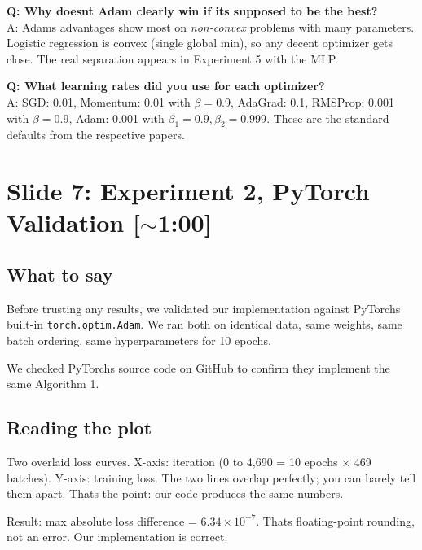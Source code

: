 \documentclass[11pt, letterpaper]{article}
\begin{document}
\begin{qabox}
\textbf{Q: Why doesnt Adam clearly win if its supposed to be the best?}\\
A: Adams advantages show most on \textit{non-convex} problems with many parameters. Logistic regression is convex (single global min), so any decent optimizer gets close. The real separation appears in Experiment 5 with the MLP.

\textbf{Q: What learning rates did you use for each optimizer?}\\
A: SGD: 0.01, Momentum: 0.01 with $\beta = 0.9$, AdaGrad: 0.1, RMSProp: 0.001 with $\beta = 0.9$, Adam: 0.001 with $\beta_1 = 0.9, \beta_2 = 0.999$. These are the standard defaults from the respective papers.
\end{qabox}


\section{Slide 7: Experiment 2, PyTorch Validation \textnormal{\color{muted}[$\sim$1:00]}}

\subsection{What to say}

Before trusting any results, we validated our implementation against PyTorchs built-in \texttt{torch.optim.Adam}. We ran both on identical data, same weights, same batch ordering, same hyperparameters for 10 epochs.

We checked PyTorchs source code on GitHub to confirm they implement the same Algorithm 1.

\subsection{Reading the plot}
Two overlaid loss curves. X-axis: iteration (0 to 4,690 = 10 epochs $\times$ 469 batches). Y-axis: training loss. The two lines overlap perfectly; you can barely tell them apart. Thats the point: our code produces the same numbers.

Result: max absolute loss difference = $6.34 \times 10^{-7}$. Thats floating-point rounding, not an error. Our implementation is correct.
\end{document}
